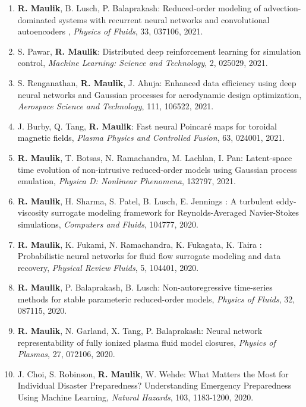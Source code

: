 \documentclass[letterpaper]{article}
\begin{document}
\begin{enumerate}
\item \textbf{R. Maulik}, B. Lusch, P. Balaprakash: Reduced-order modeling of advection-dominated systems with recurrent neural networks and convolutional autoencoders , {\it Physics of Fluids}, 33, 037106, 2021.

\item S. Pawar, \textbf{R. Maulik}: Distributed deep reinforcement learning for simulation control, {\it Machine Learning: Science and Technology}, 2, 025029, 2021.

\item S. Renganathan, \textbf{R. Maulik}, J. Ahuja: Enhanced data efficiency using deep neural networks and Gaussian processes for aerodynamic design optimization, {\it Aerospace Science and Technology}, 111, 106522, 2021.

\item J. Burby, Q. Tang, \textbf{R. Maulik}: Fast neural Poincar\'{e} maps for toroidal magnetic fields, {\it Plasma Physics and Controlled Fusion}, 63, 024001, 2021.

\item \textbf{R. Maulik}, T. Botsas, N. Ramachandra, M. Lachlan, I. Pan: Latent-space time evolution of non-intrusive reduced-order models using Gaussian process emulation, {\it Physica D: Nonlinear Phenomena}, 132797, 2021. 

\item \textbf{R. Maulik}, H. Sharma, S. Patel, B. Lusch, E. Jennings : A turbulent eddy-viscosity surrogate modeling framework for Reynolds-Averaged Navier-Stokes simulations, {\it Computers and Fluids}, 104777, 2020. 

\item \textbf{R. Maulik}, K. Fukami, N. Ramachandra, K. Fukagata, K. Taira : Probabilistic neural networks for fluid flow surrogate modeling and data recovery, {\it Physical Review Fluids}, 5, 104401, 2020. 

\item \textbf{R. Maulik}, P. Balaprakash, B. Lusch: Non-autoregressive time-series methods for stable parameteric reduced-order models, {\it Physics of Fluids}, 32, 087115, 2020.

\item \textbf{R. Maulik}, N. Garland, X. Tang, P. Balaprakash: Neural network representability of fully ionized plasma fluid model closures, {\it Physics of Plasmas}, 27, 072106, 2020.

\item J. Choi, S. Robinson, \textbf{R. Maulik}, W. Wehde: What Matters the Most for Individual Disaster Preparedness? Understanding Emergency Preparedness Using Machine Learning, {\it Natural Hazards}, 103, 1183-1200, 2020. 


\end{enumerate}
\end{document}

